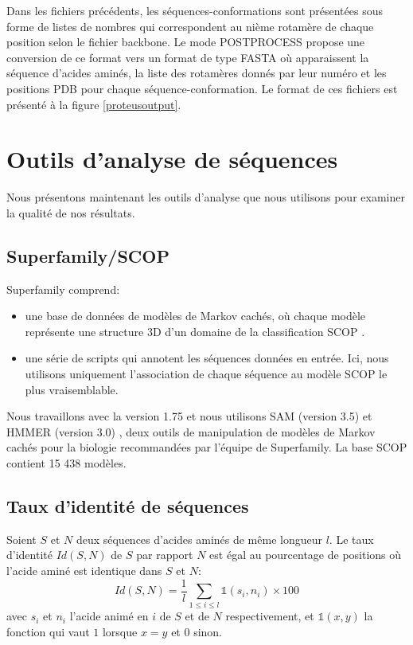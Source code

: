 Dans les fichiers précédents, les séquences-conformations sont présentées sous forme de listes de nombres qui correspondent au nième rotamère de chaque position selon le fichier backbone. Le mode POSTPROCESS propose une conversion de ce format vers un format de type FASTA où apparaissent la séquence d'acides aminés, la liste des rotamères donnés par leur numéro et les positions PDB pour chaque séquence-conformation. Le format de ces fichiers est présenté à la figure \ref{proteusoutput}.

\section{Outils d'analyse de séquences}

Nous présentons maintenant les outils d'analyse que nous utilisons pour examiner la qualité de nos résultats.
\subsection{Superfamily/SCOP}
\label{sec:Superfamily}
Superfamily \cite{Madera04} comprend: 
\begin{itemize}
\item une base de données de modèles de Markov cachés, où chaque modèle représente une structure 3D d'un domaine de la classification SCOP \cite{Andreeva04}.
\item une série de scripts qui annotent les séquences données en entrée. Ici, nous utilisons uniquement l'association de chaque séquence au modèle SCOP le plus vraisemblable. 
\end{itemize}
Nous travaillons avec la version 1.75 et nous utilisons SAM (version 3.5) \cite{hughey95} et HMMER (version 3.0) \cite{HMMER}, deux outils de manipulation de modèles de Markov cachés pour la biologie recommandées par l'équipe de Superfamily. La base SCOP contient 15 438 modèles.

\subsection{Taux d'identité de séquences}

Soient $S$ et $N$ deux séquences d'acides aminés de même longueur $l$. Le taux d'identité $Id(S,N)$ de $S$ par rapport $N$ est égal au pourcentage de positions où l'acide aminé est identique dans $S$ et $N$:
\begin{equation}
Id(S,N) =\frac{1}{l}\sum_{1 \leqslant i \leqslant l} \mathds{1}(s_i,n_i) \times 100
\end{equation}
avec $s_i$ et $n_i$ l'acide animé en $i$ de $S$ et de $N$ respectivement, et $\mathds{1}(x,y)$ la fonction qui vaut $1$ lorsque $x=y$ et $0$ sinon. 
